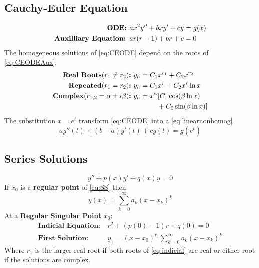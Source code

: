 \documentclass[10pt,leqno]{article}
\begin{document}
\begin{multicols}{2}
\subsection*{Cauchy-Euler Equation}
\begin{align}
\text{\textbf{ODE: }} &ax^2y''+bxy'+cy=g(x) \label{eq:CEODE}\\
\text{\textbf{Auxilliary Equation: }}& ar(r-1)+br+c=0\label{eq:CEODEAux}
\end{align}
The homogeneous solutions of \eqref{eq:CEODE} depend on the roots of \eqref{eq:CEODEAux}: 
\begin{align}
\text{\textbf{Real Roots$(r_1 \neq r_2)$:}}&\ y_{h} = C_1x^{r_1} + C_2x^{r_2}\\
\text{\textbf{Repeated$(r_1 = r_2)$:}}&\ y_{h} = C_1 x^r + C_2 x^r \ln x\\
\text{\textbf{Complex$(r_{1,2}=\alpha\pm i\beta)$:}}&\ y_{h}=x^{\alpha}[C_1\cos( \beta \ln x) \nonumber \\
                                               & \phantom{y_{h}=x^{\alpha}[} + C_2 \sin (\beta \ln x)] \label{eq:comprootCEODE}
\end{align}
The substitution $x=e^{t}$ transform \eqref{eq:CEODE} into a \eqref{eq:linearnonhomog}
\begin{equation}
ay''(t)+(b-a)y'(t)+cy(t) = g(e^t)
\end{equation}


\vspace{-1ex}\subsection*{Series Solutions}
\begin{equation}
y''+p(x)y'+q(x)y=0 \label{eq:SS}
\end{equation}
If $x_0$ is a \textbf{regular point} of \eqref{eq:SS} then 
\begin{equation}
y(x) = \sum_{k=0}^{\infty}a_k(x-x_k)^k
\end{equation}
At a \textbf{Regular Singular Point } $x_0$: 
\begin{align}
\textbf{Indicial Equation:}\ &r^2+(p(0)-1)r + q(0)=0 \label{eq:indicial}\\
\textbf{First Solution: }\ &y_1=(x-x_0)^{r_1}\sum_{k=0}^{\infty}a_k(x-x_k)^k
\end{align}
Where $r_1$ is the larger real root if both roots of \eqref{eq:indicial}  are real or either root if the solutions are complex. 
\end{multicols}
\end{document}
